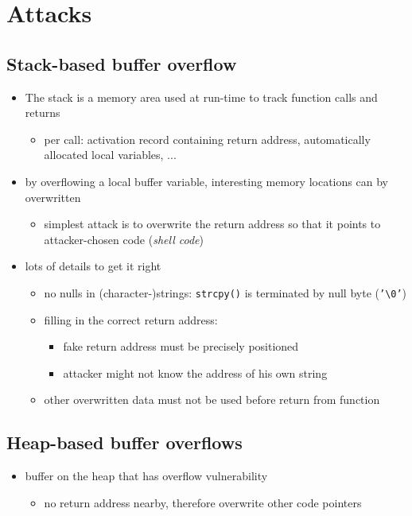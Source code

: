 \documentclass[12pt,titlepage,a4paper]{report}
\begin{document}
		\section{Attacks}
			\subsection{Stack-based buffer overflow}
				\begin{itemize}
					\item The stack is a memory area used at run-time to track function calls and returns
					\begin{itemize}
						\item per call: activation record containing return address, automatically allocated local variables, ...
					\end{itemize}
					\item by overflowing a local buffer variable, interesting memory locations can by overwritten
					\begin{itemize}
						\item simplest attack is to overwrite the return address so that it points to attacker-chosen code (\emph{shell code})
					\end{itemize}
					\item lots of details to get it right
					\begin{itemize}
						\item no nulls in (character-)strings: {\texttt{strcpy()} is terminated by null byte (\texttt{'\textbackslash0'})}
						\item filling in the correct return address:
						\begin{itemize}
							\item fake return address must be precisely positioned
							\item attacker might not know the address of his own string
						\end{itemize}
						\item other overwritten data must not be used before return from function
					\end{itemize}
				\end{itemize}

			\subsection{Heap-based buffer overflows}
				\begin{itemize}
					\item buffer on the heap that has overflow vulnerability
					\begin{itemize}
						\item no return address nearby, therefore overwrite other code pointers
					\end{itemize}
				\end{itemize}
			
\end{document}
